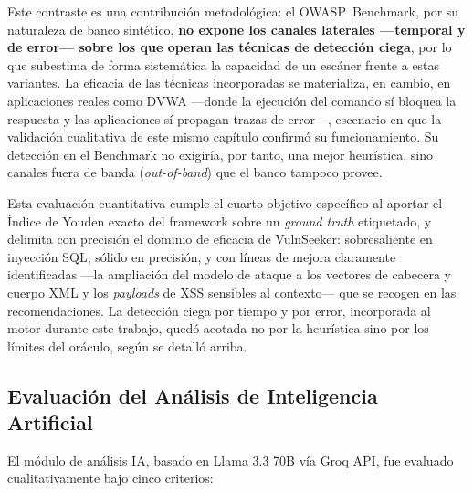 \documentclass[12pt, a4paper]{article}
\begin{document}
Este contraste es una contribución metodológica: el OWASP~Benchmark, por su
naturaleza de banco sintético, \textbf{no expone los canales laterales ---temporal
y de error--- sobre los que operan las técnicas de detección ciega}, por lo que
subestima de forma sistemática la capacidad de un escáner frente a estas variantes.
La eficacia de las técnicas incorporadas se materializa, en cambio, en aplicaciones
reales como DVWA ---donde la ejecución del comando sí bloquea la respuesta y las
aplicaciones sí propagan trazas de error---, escenario en que la validación
cualitativa de este mismo capítulo confirmó su funcionamiento. Su detección en el
Benchmark no exigiría, por tanto, una mejor heurística, sino canales fuera de banda
(\textit{out-of-band}) que el banco tampoco provee.

Esta evaluación cuantitativa cumple el cuarto objetivo específico al aportar el
Índice de Youden exacto del framework sobre un \textit{ground truth} etiquetado, y
delimita con precisión el dominio de eficacia de VulnSeeker: sobresaliente en
inyección SQL, sólido en precisión, y con líneas de mejora claramente
identificadas ---la ampliación del modelo de ataque a los vectores de cabecera y
cuerpo XML y los \textit{payloads} de XSS sensibles al contexto--- que se recogen
en las recomendaciones. La detección ciega por tiempo y por error, incorporada al
motor durante este trabajo, quedó acotada no por la heurística sino por los límites
del oráculo, según se detalló arriba.

\subsection{Evaluación del Análisis de Inteligencia Artificial}


El módulo de análisis IA, basado en Llama 3.3 70B vía Groq API, fue evaluado
cualitativamente bajo cinco criterios:
\end{document}
